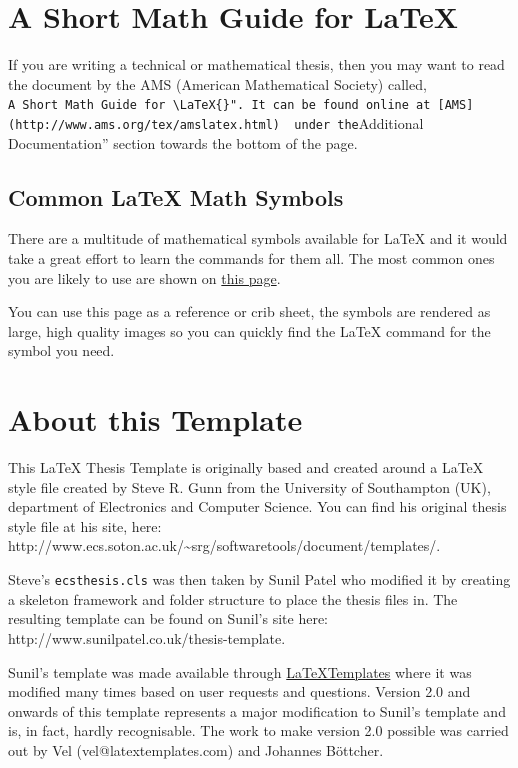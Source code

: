 \documentclass[
  letterpaper,
  11pt,
  english,
  singlespacing,
  headsepline]{MastersDoctoralThesis}
\begin{document}
\section{\texorpdfstring{A Short Math Guide for
\LaTeX{}}{A Short Math Guide for }}\label{a-short-math-guide-for-1}

If you are writing a technical or mathematical thesis, then you may want
to read the document by the AMS (American Mathematical Society) called,
\texttt{A\ Short\ Math\ Guide\ for\ \textbackslash{}LaTeX\{\}".\ It\ can\ be\ found\ online\ at\ {[}AMS{]}(http://www.ams.org/tex/amslatex.html)\ \ under\ the}Additional
Documentation'' section towards the bottom of the page.

\subsection{\texorpdfstring{Common \LaTeX{} Math
Symbols}{Common  Math Symbols}}\label{common-math-symbols-1}

There are a multitude of mathematical symbols available for \LaTeX{} and
it would take a great effort to learn the commands for them all. The
most common ones you are likely to use are shown on
\href{http://www.sunilpatel.co.uk/latex-type/latex-math-symbols/}{this
page}.

You can use this page as a reference or crib sheet, the symbols are
rendered as large, high quality images so you can quickly find the
\LaTeX{} command for the symbol you need.

\section{About this Template}\label{about-this-template-1}

This \LaTeX{} Thesis Template is originally based and created around a
\LaTeX{} style file created by Steve R. Gunn from the University of
Southampton (UK), department of Electronics and Computer Science. You
can find his original thesis style file at his site, here:
http://www.ecs.soton.ac.uk/\textasciitilde srg/softwaretools/document/templates/.

Steve's \texttt{ecsthesis.cls} was then taken by Sunil Patel who
modified it by creating a skeleton framework and folder structure to
place the thesis files in. The resulting template can be found on
Sunil's site here: http://www.sunilpatel.co.uk/thesis-template.

Sunil's template was made available through
\href{http://www.LaTeXTemplates.com}{LaTeXTemplates} where it was
modified many times based on user requests and questions. Version 2.0
and onwards of this template represents a major modification to Sunil's
template and is, in fact, hardly recognisable. The work to make version
2.0 possible was carried out by Vel (vel@latextemplates.com) and
Johannes Böttcher.
\end{document}
